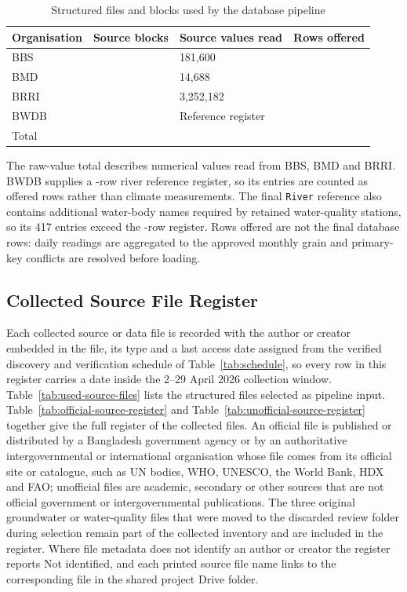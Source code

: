 \begin{table}[H]
\centering
\caption{Structured files and blocks used by the database pipeline}
\label{tab:source-profile}
\renewcommand{\arraystretch}{1.38}
\begin{tabular}{L{0.25\textwidth}C{0.17\textwidth}C{0.24\textwidth}C{0.18\textwidth}}
\toprule
Organisation & Source blocks & Source values read & Rows offered \\
\midrule
BBS & \mBlocksBBS{} & 181,600 & \mOfferedBBS{} \\
BMD & \mBlocksBMD{} & 14,688 & \mOfferedBMD{} \\
BRRI & \mBlocksBRRI{} & 3,252,182 & \mOfferedBRRI{} \\
BWDB & \mBlocksBWDB{} & Reference register & \mOfferedBWDB{} \\
\midrule
Total & \mSourceBlocks{} & \mRawValues{} & \mRowsOffered{} \\
\bottomrule
\end{tabular}
\end{table}

The raw-value total describes numerical values read from BBS, BMD and BRRI.
BWDB supplies a \mOfferedBWDB-row river reference register, so its entries are
counted as offered rows rather than climate measurements. The final
\texttt{River} reference also contains additional water-body names required by
retained water-quality stations, so its 417 entries exceed the
\mOfferedBWDB-row register. Rows offered are not the final database rows: daily
readings are aggregated to the approved monthly grain and primary-key conflicts
are resolved before loading.

\subsection{Collected Source File Register}
\label{subsec:source-file-register}

Each collected source or data file is recorded with the author or creator
embedded in the file, its type and a last access date assigned from the
verified discovery and verification schedule of Table~\ref{tab:schedule}, so
every row in this register carries a date inside the 2--29 April 2026
collection window. Table~\ref{tab:used-source-files}
lists the \mSourceFiles{} structured files selected as pipeline input.
Table~\ref{tab:official-source-register} and
Table~\ref{tab:unofficial-source-register} together give the full register of
the \mSourceDataFiles{} collected files. An official file is published or
distributed by a Bangladesh government agency or by an authoritative
intergovernmental or international organisation whose file comes from its
official site or catalogue, such as UN bodies, WHO, UNESCO, the World Bank,
HDX and FAO; unofficial files are academic, secondary or other sources that
are not official government or intergovernmental publications. The three
original groundwater or water-quality files that were moved to the discarded
review folder during selection remain part of the collected inventory and are
included in the register. Where file metadata does not identify an author or
creator the register reports Not identified, and each printed source file name
links to the corresponding file in the shared project Drive folder.

